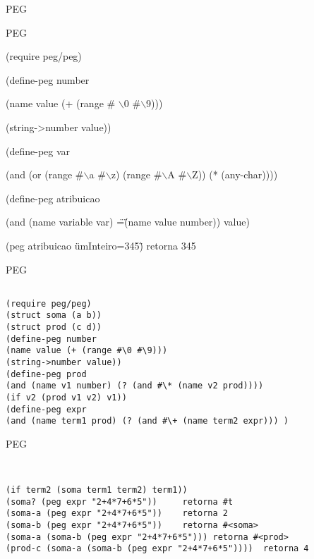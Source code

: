 \documentclass{beamer}
\begin{document}


\begin{frame}[fragile]{PEG}

PEG

(require peg/peg)

(define-peg number

            (name value (+ (range \# $\backslash$0 \#$\backslash$9)))
            
            (string->number value))
            
(define-peg var

            (and (or (range \#$\backslash$a \#$\backslash$z) (range \#$\backslash$A \#$\backslash$Z)) (* (any-char))))
            

(define-peg atribuicao

            (and (name variable var) \"=\" (name value number)) value)
            
(peg atribuicao \"umInteiro=345\") retorna 345

\end{frame}



\begin{frame}[fragile]{PEG}
\begin{verbatim}

(require peg/peg)
(struct soma (a b))
(struct prod (c d))
(define-peg number
(name value (+ (range #\0 #\9)))
(string->number value))
(define-peg prod
(and (name v1 number) (? (and #\* (name v2 prod))))
(if v2 (prod v1 v2) v1))
(define-peg expr
(and (name term1 prod) (? (and #\+ (name term2 expr))) )

\end{verbatim}
\end{frame}


\begin{frame}[fragile]{PEG}
\begin{verbatim}


(if term2 (soma term1 term2) term1))
(soma? (peg expr "2+4*7+6*5"))     retorna #t
(soma-a (peg expr "2+4*7+6*5"))    retorna 2
(soma-b (peg expr "2+4*7+6*5"))    retorna #<soma>
(soma-a (soma-b (peg expr "2+4*7+6*5"))) retorna #<prod>
(prod-c (soma-a (soma-b (peg expr "2+4*7+6*5"))))  retorna 4
\end{verbatim}
\end{frame}

\end{document}

